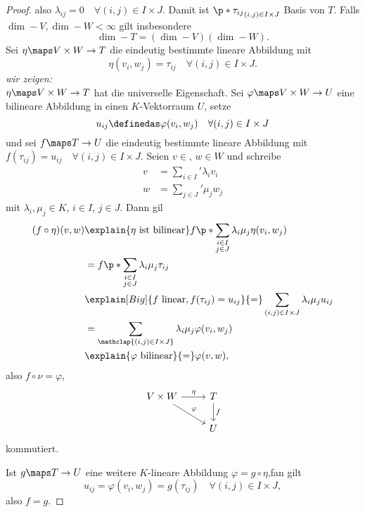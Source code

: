 \begin{proof}
  also \( \lambda_{ij}=0\quad \forall (i,j)\in I\times J \). Damit ist \( \p*{\tau_{ij}}_{(i,j)\in I\times J} \) Basis von \( T \). Falls \( \dim-{V},\dim-{W}<\infty \) gilt insbesondere
  \begin{equation*}
    \dim-{T}=(\dim-{V})(\dim-{W}).
  \end{equation*}
  Sei \( \eta\maps V\times W\to T \) die eindeutig bestimmte lineare Abbildung mit
  \begin{equation*}
    \eta(v_i,w_j)=\tau_{ij}\quad \forall (i,j)\in I\times J.
  \end{equation*}
  \emph{wir zeigen:}\\
  \( \eta\maps V\times W\to T \) hat die universelle Eigenschaft. Sei \( \varphi\maps V\times W\to U \) eine bilineare Abbildung in einen \( K \)-Vektorraum \( U \), setze
  \begin{equation*}
    u_{ij}\definedas \varphi(v_i,w_j)\quad \forall (i,j)\in I\times J
  \end{equation*}
  und sei \( f\maps T\to U \) die eindeutig bestimmte lineare Abbildung mit \( f(\tau_{ij})=u_{ij} \quad \forall (i,j)\in I\times J\). Seien \( v\in  \), \( w\in W \) und schreibe 
  \begin{align*}
    v&=\sum_{i\in I}'\lambda_i v_i\\
    w&=\sum_{j\in J}'\mu_j w_j
  \end{align*}
  mit \( \lambda_i,\mu_j\in K \), \( i\in I \), \( j\in J \). Dann gil
  \begin{align*}
    (f\circ \eta)(v,w)&\explain{\eta \text{ ist bilinear}}f\p*{\sum_{\substack{i\in I\\ j\in J}}\lambda_i \mu_j \eta(v_i,w_j)}\\
    &=f\p*{\sum_{\substack{i\in I\\ j\in J}}\lambda_i \mu_j \tau_{ij}}\\
    &\explain[Big]{f \text{ linear},f(\tau_{ij})=u_{ij}}{=}\sum_{(i,j)\in I\times J}\lambda_i \mu_j u_{ij}\\
    &=\sum_{\mathclap{(i,j)\in I\times J}}\lambda_i \mu_j \varphi(v_i,w_j)\\
    &\explain{\varphi \text{ bilinear}}{=}\varphi(v,w),
  \end{align*}
  also \( f\circ \nu=\varphi \), \dh
  \begin{equation*}
    \begin{tikzcd}
      V\times W\arrow[r,"\eta"]\arrow[dr,"\varphi"]&T\arrow[d,"f"]\\
      &U
    \end{tikzcd}
  \end{equation*}
  kommutiert.

  Ist \( g\maps T\to U \) eine weitere \( K \)-lineare Abbildung \( \varphi=g\circ \eta \),fan gilt
  \begin{equation*}
    u_{ij}=\varphi(v_i,w_j)=g(\tau_{ij})\quad \forall (i,j)\in I\times J,
  \end{equation*}
  also \( f=g \).
\end{proof}